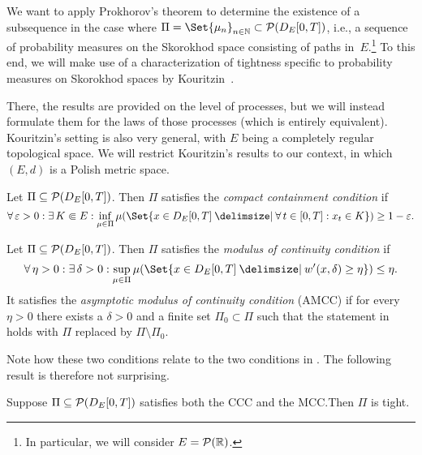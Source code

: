 We want to apply Prokhorov's theorem to determine the existence of a subsequence in the case where \( \Pi = \Set{\mu_n}_{n\in\bN} \subset \cP(D_{E}[0,T]) \), i.e., a sequence of probability measures on the Skorokhod space consisting of paths in~\(E\).\footnote{In particular, we will consider \(E = \mathcal{P}(\mathbb{R})\).}
To this end, we will make use of a characterization of tightness specific to probability measures on Skorokhod spaces by Kouritzin~\cite{kouritzinTightnessProbabilityMeasures2015}.

There, the results are provided on the level of processes, but we will instead formulate them for the laws of those processes (which is entirely equivalent).
Kouritzin's setting is also very general, with \( E \) being a completely regular topological space.
We will restrict Kouritzin's results to our context, in which \((E,d)\) is a Polish metric space.

\begin{definition}[CCC]\label{def:CCC}
  Let \( \Pi \subseteq \mathcal{P}(D_{E}[0,T]) \).
  Then \( \Pi \) satisfies the \textit{compact containment condition} if
  \begin{equation}
    \forall \eps > 0 : \exists K \Subset E : \inf_{\mu \in \Pi} \mu(\Set{x \in D_E[0,T] \given \forall t \in [0,T] : x_t \in K}) \geq 1 - \eps.
  \end{equation}
\end{definition}

\begin{definition}[MCC]\label{def:MCC}
  Let \( \Pi \subseteq \mathcal{P}(D_{E}[0,T]) \).
  Then \( \Pi \) satisfies the \textit{modulus of continuity condition} if
  \begin{equation}\label{eq:MCC}
    \forall \eta > 0 : \exists \delta > 0 : \sup_{\mu \in \Pi} \mu(\Set{x \in D_E[0,T] \given w'(x,\delta) \geq \eta}) \leq \eta.
  \end{equation}
  It satisfies the \textit{asymptotic modulus of continuity condition} (AMCC) if for every \( \eta > 0 \) there exists a \( \delta > 0 \) and a finite set \( \Pi_0 \subset \Pi \) such that the statement in  holds with \( \Pi \) replaced by \( \Pi \setminus \Pi_0 \).
\end{definition}

Note how these two conditions relate to the two conditions in .
The following result is therefore not surprising.

\begin{theorem}
  Suppose \( \Pi \subseteq \mathcal{P}(D_{E}[0,T]) \) satisfies both the CCC and the MCC.\@ Then \( \Pi \) is tight.
\end{theorem}

